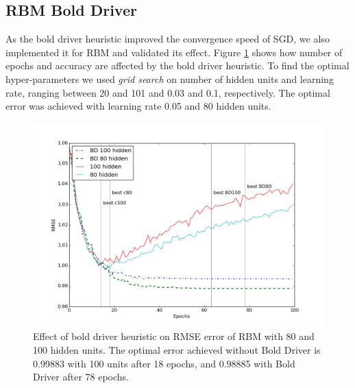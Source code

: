 \documentclass[10pt,conference,compsocconf]{IEEEtran}
\begin{document}
	\subsection{RBM Bold Driver}
	As the bold driver heuristic improved the convergence speed of SGD, we also implemented it for RBM and validated its effect. Figure \ref{fig:rbm-conv-zoom} shows how number of epochs and accuracy are affected by the bold driver heuristic. To find the optimal hyper-parameters we used \emph{grid search} on number of hidden units and learning rate, ranging between 20 and 101 and 0.03 and 0.1, respectively. The optimal error was achieved with learning rate 0.05 and 80 hidden units.
	
	
	
	\begin{figure}[htbp]
		\centering
		\includegraphics[scale=0.3]{conv_rbm_all.png}
		\caption{Effect of bold driver heuristic on RMSE error of RBM with 80 and 100 hidden units. The optimal error achieved without Bold Driver is 0.99883 with 100 units after 18 epochs, and 0.98885 with Bold Driver after 78 epochs.}
		\label{fig:rbm-conv-zoom}
	\end{figure} 
	
\end{document}
